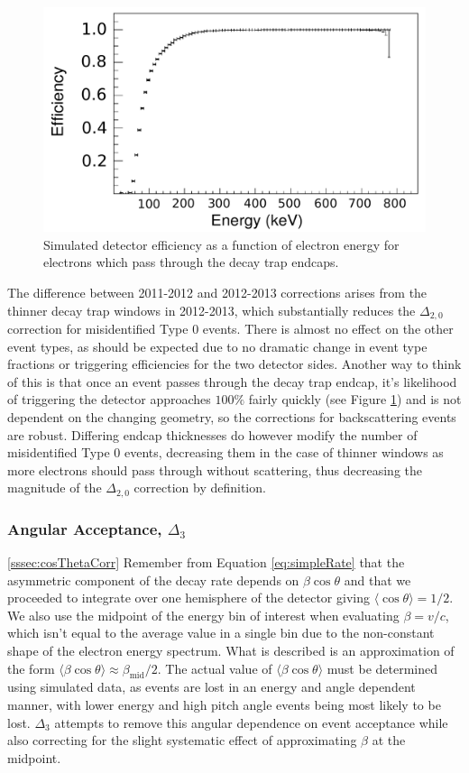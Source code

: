 \begin{figure}[h]
  \centering
  \includegraphics[scale=0.40]{5-UCNAResults/efficiency.pdf}  
  \caption{Simulated detector efficiency as a function of electron energy for electrons which
  pass through the decay trap endcaps.}
  \label{fig:effic}
\end{figure}

The difference between 2011-2012 and 2012-2013 corrections arises from the thinner
decay trap windows in 2012-2013, which substantially reduces the $\Delta_{2,0}$
correction for
misidentified Type 0 events. There is almost no effect on the other event types, as should
be expected due to no dramatic change in event type fractions or triggering efficiencies
for the two detector sides. Another way to think of this is that once an event passes through the
decay trap endcap, it's likelihood of triggering the detector approaches $100\%$ fairly quickly
(see Figure \ref{fig:effic}) and is not dependent on the changing geometry, so the corrections for
backscattering events are robust. Differing endcap thicknesses do however modify the number of misidentified
Type 0 events, decreasing them in the case of thinner windows as more electrons should pass through without
scattering, thus decreasing the magnitude of the
$\Delta_{2,0}$ correction by definition.


\subsubsection{Angular Acceptance, $\Delta_{3}$} \ref{sssec:cosThetaCorr}
Remember from Equation \ref{eq:simpleRate} that the asymmetric
component of the decay rate depends on
$\beta\cos\theta$ and that we proceeded to integrate over one hemisphere
of the detector giving $\langle\cos\theta\rangle=1/2$. We also use the midpoint
of the energy bin of interest when evaluating $\beta=v/c$, which isn't equal to the
average value in a single bin due to the non-constant shape of the electron energy
spectrum. What is described is
an approximation of the form $\langle\beta\cos\theta\rangle \approx \beta_{\mathrm{mid}}/2$. The actual
value of $\langle\beta\cos\theta\rangle$ must be determined using simulated
data, as events are lost in an energy and angle dependent manner, with lower energy and
high pitch angle events being most likely to be lost. $\Delta_{3}$ attempts to
remove this angular dependence on event acceptance while also correcting for the slight
systematic effect of approximating $\beta$ at the midpoint.

